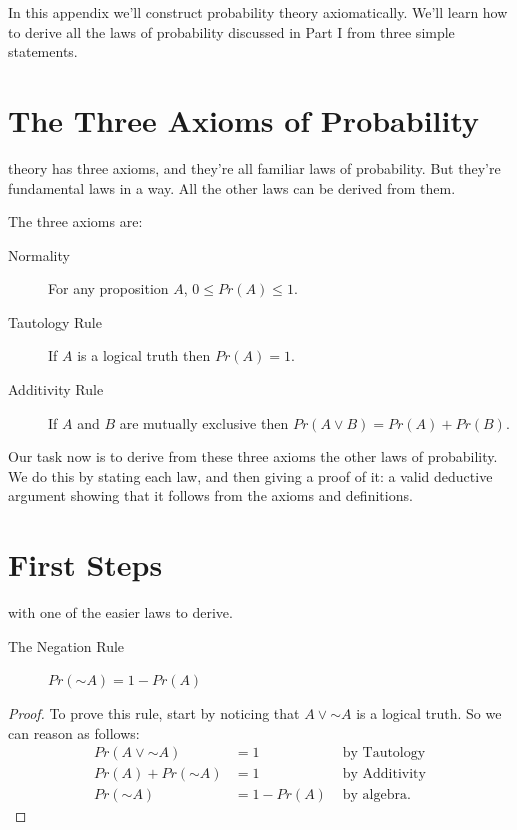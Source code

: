 \documentclass[justified]{tufte-book}
\renewcommand{\neg}{\mathbin{\sim}}
\newcommand{\p}{Pr}
\theoremstyle{definition}
\theoremstyle{definition}
\theoremstyle{definition}
\theoremstyle{remark}
\let\BeginKnitrBlock\begin \let\EndKnitrBlock\end
\begin{document}
In this appendix we'll construct probability theory axiomatically. We'll
learn how to derive all the laws of probability discussed in Part I from
three simple statements.

\hypertarget{the-three-axioms-of-probability}{%
\section*{The Three Axioms of
Probability}\label{the-three-axioms-of-probability}}

 theory has three axioms, and they're all
familiar laws of probability. But they're fundamental laws in a way. All
the other laws can be derived from them.

The three axioms are:

\begin{description}
\item[Normality]
For any proposition \(A\), \(0 \leq \p(A) \leq 1\).
\item[Tautology Rule]
If \(A\) is a logical truth then \(\p(A) = 1\).
\item[Additivity Rule]
If \(A\) and \(B\) are mutually exclusive then
\(\p(A \vee B) = \p(A) + \p(B)\).
\end{description}

Our task now is to derive from these three axioms the other laws of
probability. We do this by stating each law, and then giving a proof of
it: a valid deductive argument showing that it follows from the axioms
and definitions.

\hypertarget{first-steps}{%
\section*{First Steps}\label{first-steps}}

 with one of the easier laws to derive.

\begin{description}
\item[The Negation Rule]
\(\p(\neg A) = 1 - \p(A)\)
\end{description}

\BeginKnitrBlock{proof}
{} To prove this rule, start by noticing that
\(A \vee \neg A\) is a logical truth. So we can reason as follows: \[
  \begin{aligned}
  \p(A \vee \neg A)  &= 1                 & \mbox{ by Tautology}\\
  \p(A) + \p(\neg A) &= 1                 & \mbox{ by Additivity}\\
  \p(\neg A)         &= 1 - \p(A)         & \mbox{ by algebra.}
  \end{aligned}
\]
\EndKnitrBlock{proof}
\end{document}
